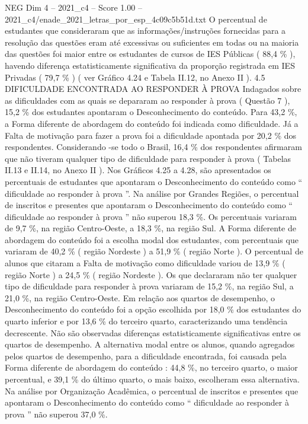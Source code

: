 \begin{textsample}{NEG Dim 4 – 2021\_c4 – Score 1.00 – 2021\_c4/enade\_2021\_letras\_por\_esp\_4c09c5b51d.txt}
O percentual de estudantes que consideraram que as informações/instruções fornecidas para a resolução das questões eram até excessivas ou suficientes em todas ou na maioria das questões foi maior entre os estudantes de cursos de IES Públicas ( 88,4 \% ), havendo diferença estatisticamente significativa da proporção registrada em IES Privadas ( 79,7 \% ) ( ver Gráfico 4.24 e Tabela II.12, no Anexo II ). 4.5 DIFICULDADE ENCONTRADA AO RESPONDER À PROVA Indagados sobre as dificuldades com as quais se depararam ao responder à prova ( Questão 7 ), 15,2 \% dos estudantes apontaram o Desconhecimento do conteúdo.
Para 43,2 \%, a Forma diferente de abordagem do conteúdo foi indicada como dificuldade.
Já a Falta de motivação para fazer a prova foi a dificuldade apontada por 20,2 \% dos respondentes.
Considerando -se todo o Brasil, 16,4 \% dos respondentes afirmaram que não tiveram qualquer tipo de dificuldade para responder à prova ( Tabelas II.13 e II.14, no Anexo II ).
Nos Gráficos 4.25 a 4.28, são apresentados os percentuais de estudantes que apontaram o Desconhecimento do conteúdo como “ dificuldade ao responder à prova ”.
Na análise por Grandes Regiões, o percentual de inscritos e presentes que apontaram o Desconhecimento do conteúdo como “ dificuldade ao responder à prova ” não superou 18,3 \%.
Os percentuais variaram de 9,7 \%, na região Centro-Oeste, a 18,3 \%, na região Sul.
A Forma diferente de abordagem do conteúdo foi a escolha modal dos estudantes, com percentuais que variaram de 40,2 \% ( região Nordeste ) a 51,9 \% ( região Norte ).
O percentual de alunos que citaram a Falta de motivação como dificuldade variou de 13,9 \% ( região Norte ) a 24,5 \% ( região Nordeste ).
Os que declararam não ter qualquer tipo de dificuldade para responder à prova variaram de 15,2 \%, na região Sul, a 21,0 \%, na região Centro-Oeste.
Em relação aos quartos de desempenho, o Desconhecimento do conteúdo foi a opção escolhida por 18,0 \% dos estudantes do quarto inferior e por 13,6 \% do terceiro quarto, caracterizando uma tendência decrescente.
Não são observadas diferenças estatisticamente significativas entre os quartos de desempenho.
A alternativa modal entre os alunos, quando agregados pelos quartos de desempenho, para a dificuldade encontrada, foi causada pela Forma diferente de abordagem do conteúdo : 44,8 \%, no terceiro quarto, o maior percentual, e 39,1 \% do último quarto, o mais baixo, escolheram essa alternativa.
Na análise por Organização Acadêmica, o percentual de inscritos e presentes que apontaram o Desconhecimento do conteúdo como “ dificuldade ao responder à prova ” não superou 37,0 \%.

\end{textsample}
